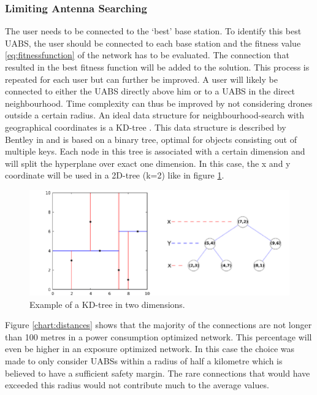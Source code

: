 \subsubsection{Limiting Antenna Searching}
The user needs to be connected to the `best' base station. To identify this best \gls{UABS}, the user should be connected 
to each base station and the fitness value \ref{eq:fitnessfunction} of the network has to be evaluated. 
The connection that resulted in the best fitness function
will be added to the solution. This process is repeated for each user but can further be improved. 
A user will likely be connected to either the
\gls{UABS} directly above him or to a \gls{UABS} in the direct neighbourhood. 
Time complexity can thus be improved by not considering drones outside a certain radius.
An ideal data structure for neighbourhood-search with geographical coordinates is a KD-tree \cite{J27,J28}. 
This data structure  is described by Bentley in \cite{J29}  and is based on a binary tree, optimal for objects consisting out of 
multiple keys.
Each node in this tree is associated with a certain dimension and will split the hyperplane over exact one dimension.
In this case, the x and y coordinate will be used in a 2D-tree (k=2) like in figure \ref{fig:exampleKDtree}.

\begin{figure}[]
  \centering
  \includegraphics[width=\textwidth/10*9]{../images/Example-of-a-2D-k-d-tree.png}
  \caption{Example of a KD-tree in two dimensions.}
  \label{fig:exampleKDtree}
\end{figure}

Figure \ref{chart:distances} shows that the majority of the connections are not longer than 100 metres in a power consumption 
optimized network. This percentage will even be higher in  an exposure optimized network.
In this case the choice was made to only consider \gls{UABS}s within a radius of half a kilometre which is believed 
to have a sufficient safety margin. The rare connections that would have exceeded this radius would not contribute much to 
the average values.

